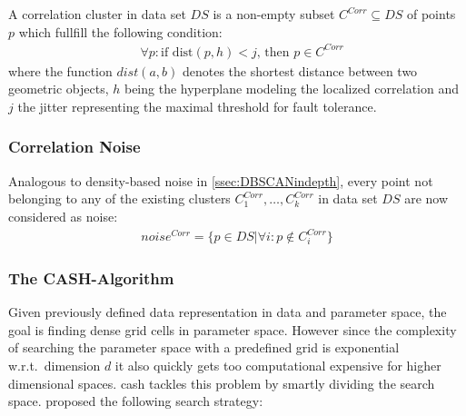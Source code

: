 A correlation cluster in data set $DS$ is a non-empty subset $C^{Corr} \subseteq DS$ of points $p$ which fullfill the following condition:
\begin{align}\label{eq:pointtohyplane}
    &\forall p: \text{if } \text{dist}(p,h) < j \text{, then } p \in C^{Corr}
\end{align}
where the function $dist(a,b)$ denotes the shortest distance between two geometric objects, $h$ being the hyperplane modeling the localized correlation and $j$ the jitter representing the maximal threshold for fault tolerance.


\subsubsection*{Correlation Noise}
Analogous to density-based noise in \autoref{ssec:DBSCANindepth}, every point not belonging to any of the existing clusters $C^{Corr}_1, \dotsc, C^{Corr}_k$ in data set $DS$ are now considered as noise: 
\begin{align}
    noise^{Corr} = \{p \in  DS | \forall i : p \notin C^{Corr}_i\}
\end{align}

\subsubsection*{The CASH-Algorithm}
Given previously defined data representation in data and parameter space, the goal is finding dense grid cells in parameter space. However since the complexity of searching the parameter space with a predefined grid is exponential w.r.t.\ dimension $d$ it also quickly gets too computational expensive for higher dimensional spaces. \gls{cash} tackles this problem by smartly dividing the search space. \citeauthor{CASHachtert2008robust} proposed the following search strategy:
\vspace{5mm}

